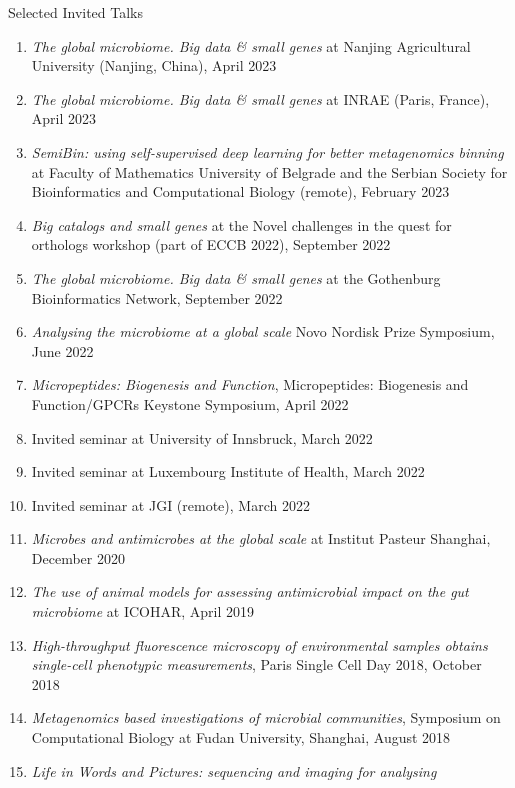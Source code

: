 \documentclass{article}
\renewcommand\subsection[1]{%
    \par\vspace{.1em}%
    {\hspace{0em}\subsubhead #1}%
    \par\vspace{.4em}%
}
\begin{document}
\subsection{Selected Invited Talks}
\begin{enumerate}
\item \emph{The global microbiome. Big data \& small genes} at Nanjing Agricultural University (Nanjing, China), April 2023
\item \emph{The global microbiome. Big data \& small genes} at INRAE (Paris, France), April 2023
\item \emph{SemiBin: using self-supervised deep learning for better metagenomics binning} at Faculty of Mathematics University of Belgrade and the Serbian Society for Bioinformatics and Computational Biology (remote), February 2023
\item \emph{Big catalogs and small genes} at the Novel challenges in the
    quest for orthologs workshop (part of ECCB 2022), September 2022
\item \emph{The global microbiome. Big data \& small genes} at the Gothenburg
    Bioinformatics Network, September 2022
\item \emph{Analysing the microbiome at a global scale} Novo Nordisk Prize
    Symposium, June 2022
\item \emph{Micropeptides: Biogenesis and Function}, Micropeptides:
    Biogenesis and Function/GPCRs Keystone Symposium, April 2022
\item Invited seminar at University of Innsbruck, March 2022
\item Invited seminar at Luxembourg Institute of Health, March 2022
\item Invited seminar at JGI (remote), March 2022
\item \emph{Microbes and antimicrobes at the global scale} at Institut Pasteur
    Shanghai, December 2020
\item \emph{The use of animal models for assessing antimicrobial impact on the
    gut microbiome} at ICOHAR, April 2019
\item \emph{High-throughput fluorescence microscopy of environmental samples
    obtains single-cell phenotypic measurements}, Paris Single Cell Day 2018,
    October 2018
\item \emph{Metagenomics based investigations of microbial communities},
    Symposium on Computational Biology at Fudan University, Shanghai, August
    2018
\item \emph{Life in Words and Pictures: sequencing and imaging for analysing
}
\end{enumerate}
\end{document}
